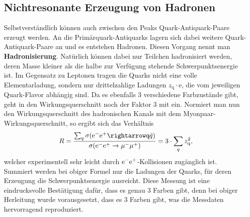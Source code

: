 \subsection{Nichtresonante Erzeugung von Hadronen}
Selbstverständlich können auch zwischen den Peaks Quark-Antiquark-Paare erzeugt werden.
An die Primärquark-Antiquarks lagern sich dabei weitere Quark-Antiquark-Paare an und es entstehen Hadronen.
Diesen Vorgang nennt man \textbf{Hadronisierung}.
Natürlich können dabei nur Teilchen hadronisiert werden, deren Masse kleiner als die halbe zur Verfügung stehende Schwerpunktsenergie ist.
Im Gegensatz zu Leptonen tragen die Quarks nicht eine volle Elementarladung, sondern nur drittelzahlige Ladungen $z_\text{q}\cdot\text{e}$, die vom jeweiligen Quark-Flavor abhängig sind.
Da es ebenfalls 3 verschiedene Farbzustände gibt, geht in den Wirkungsquerschnitt noch der Faktor 3 mit ein.
Normiert man nun den Wirkungsquerschnitt des hadronischen Kanals mit dem Myonpaar-Wirkungsquerschnitt, so ergibt sich das Verhältnis
\begin{equation*}
	R=\frac{\sum_q\sigma(\el\pos\rightarrowq\bar{q})}{\sigma(\el\pos\rightarrow\mu^-\mu^+)} = 3\cdot\sum_qz_\text{q}^2,
\end{equation*}
welcher experimentell sehr leicht durch $\text{e}^-\text{e}^+$-Kollisionen zugänglich ist.
Summiert werden bei obiger Formel nur die Ladungen der Quarks, für deren Erzeugung die Schwerpunktsenergie ausreicht.
Diese Messung ist eine eindrucksvolle Bestätigung dafür, dass es genau 3 Farben gibt, denn bei obiger Herleitung wurde vorausgesetzt, dass es 3 Farben gibt, was die Messdaten hervorragend reproduziert.
